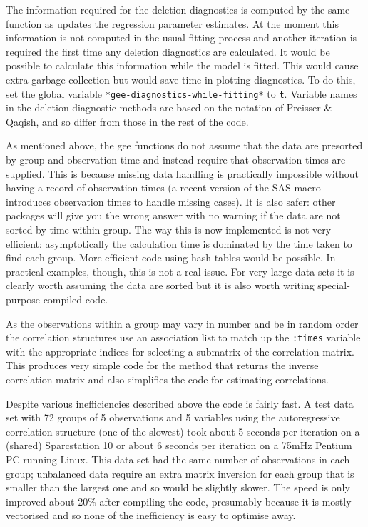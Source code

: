 \documentclass[10pt]{article}
\begin{document}
  The information required for the deletion diagnostics is computed by the same function as updates the regression parameter estimates. At the moment this information is not computed in the usual fitting process and another iteration is required the first time any deletion diagnostics are calculated. It would be possible to calculate this information while the model is fitted. This would cause extra garbage collection but would save time in plotting diagnostics. To do this, set the global variable \texttt{*gee-diagnostics-while-fitting*} to \texttt{t}. Variable names in the deletion diagnostic methods are based on the notation of Preisser \& Qaqish, and so differ from those in the rest of the code.

As mentioned above, the gee functions do not assume that the data are presorted by group and observation time and instead require that observation times are supplied. This is because missing data handling is practically impossible without having a record of observation times (a recent version of the SAS macro introduces observation times to handle missing cases). It is also safer:  other packages will give you the wrong answer with no warning if the data are not sorted by time within group.  The way this is now implemented is not very efficient: asymptotically the calculation time is dominated by the time taken to find each group. More efficient code using hash tables would be possible. In practical examples, though, this is not a real issue. For very large data sets it is clearly worth assuming the data are sorted but it is also worth writing special-purpose compiled code.

As the observations within a group may vary in number and be in random order the correlation structures use an association list to match up the \texttt{:times} variable with the appropriate indices for selecting a submatrix of the correlation matrix.  This produces very  simple code for the method that returns the inverse correlation matrix and also simplifies the code for estimating correlations.  

Despite various inefficiencies described above the code is fairly fast. A test data set with 72 groups of 5 observations and 5 variables using the autoregressive correlation structure (one of the slowest) took about 5 seconds per iteration on a (shared) Sparcstation 10 or about 6 seconds per iteration on a 75mHz Pentium PC running Linux. This data set had the same number of observations in each group; unbalanced data require an extra matrix inversion for each group that is smaller than the largest one and so would be slightly slower.
 The speed is only improved about 20\% after compiling the code, presumably because it is mostly vectorised and so none of the inefficiency is easy to optimise away.
\end{document}
